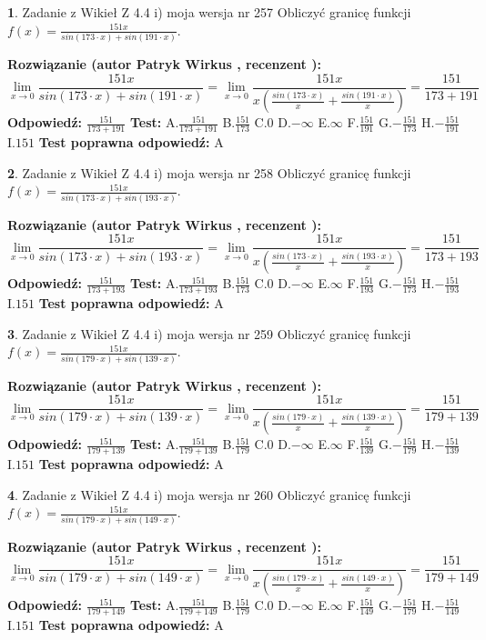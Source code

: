 \documentclass[12pt, a4paper]{article}
\theoremstyle{definition} %
\newtheorem{zad}{}
\newcommand{\zadStart}[1]{\begin{zad}#1\newline}
\newcommand{\zadStop}{\end{zad}}
\newcommand{\rozwStart}[2]{\noindent \textbf{Rozwiązanie (autor #1 , recenzent #2): }\newline}
\newcommand{\rozwStop}{\newline}
\newcommand{\odpStart}{\noindent \textbf{Odpowiedź:}\newline}
\newcommand{\odpStop}{\newline}
\newcommand{\testStart}{\noindent \textbf{Test:}\newline}
\newcommand{\testStop}{\newline}
\newcommand{\kluczStart}{\noindent \textbf{Test poprawna odpowiedź:}\newline}
\newcommand{\kluczStop}{\newline}
\begin{document}
\zadStart{Zadanie z Wikieł Z 4.4 i) moja wersja nr 257}
Obliczyć granicę funkcji $f(x)=\frac{151x}{sin(173\cdot x) +sin(191\cdot x)}$.
\zadStop
\rozwStart{Patryk Wirkus}{}
$$\lim\limits_{x\to 0}\frac{151x}{sin(173\cdot x) +sin(191\cdot x)}=\lim\limits_{x\to 0}\frac{151x}{x(\frac{sin(173\cdot x)}{x}+\frac{sin(191\cdot x)}{x})}=\frac{151}{173+191}$$
\rozwStop
\odpStart
$\frac{151}{173+191}$
\odpStop
\testStart
A.$\frac{151}{173+191}$
B.$\frac{151}{173}$
C.$0$
D.$-\infty$
E.$\infty$
F.$\frac{151}{191}$
G.$-\frac{151}{173}$
H.$-\frac{151}{191}$
I.$151$
\testStop
\kluczStart
A
\kluczStop



\zadStart{Zadanie z Wikieł Z 4.4 i) moja wersja nr 258}
Obliczyć granicę funkcji $f(x)=\frac{151x}{sin(173\cdot x) +sin(193\cdot x)}$.
\zadStop
\rozwStart{Patryk Wirkus}{}
$$\lim\limits_{x\to 0}\frac{151x}{sin(173\cdot x) +sin(193\cdot x)}=\lim\limits_{x\to 0}\frac{151x}{x(\frac{sin(173\cdot x)}{x}+\frac{sin(193\cdot x)}{x})}=\frac{151}{173+193}$$
\rozwStop
\odpStart
$\frac{151}{173+193}$
\odpStop
\testStart
A.$\frac{151}{173+193}$
B.$\frac{151}{173}$
C.$0$
D.$-\infty$
E.$\infty$
F.$\frac{151}{193}$
G.$-\frac{151}{173}$
H.$-\frac{151}{193}$
I.$151$
\testStop
\kluczStart
A
\kluczStop



\zadStart{Zadanie z Wikieł Z 4.4 i) moja wersja nr 259}
Obliczyć granicę funkcji $f(x)=\frac{151x}{sin(179\cdot x) +sin(139\cdot x)}$.
\zadStop
\rozwStart{Patryk Wirkus}{}
$$\lim\limits_{x\to 0}\frac{151x}{sin(179\cdot x) +sin(139\cdot x)}=\lim\limits_{x\to 0}\frac{151x}{x(\frac{sin(179\cdot x)}{x}+\frac{sin(139\cdot x)}{x})}=\frac{151}{179+139}$$
\rozwStop
\odpStart
$\frac{151}{179+139}$
\odpStop
\testStart
A.$\frac{151}{179+139}$
B.$\frac{151}{179}$
C.$0$
D.$-\infty$
E.$\infty$
F.$\frac{151}{139}$
G.$-\frac{151}{179}$
H.$-\frac{151}{139}$
I.$151$
\testStop
\kluczStart
A
\kluczStop



\zadStart{Zadanie z Wikieł Z 4.4 i) moja wersja nr 260}
Obliczyć granicę funkcji $f(x)=\frac{151x}{sin(179\cdot x) +sin(149\cdot x)}$.
\zadStop
\rozwStart{Patryk Wirkus}{}
$$\lim\limits_{x\to 0}\frac{151x}{sin(179\cdot x) +sin(149\cdot x)}=\lim\limits_{x\to 0}\frac{151x}{x(\frac{sin(179\cdot x)}{x}+\frac{sin(149\cdot x)}{x})}=\frac{151}{179+149}$$
\rozwStop
\odpStart
$\frac{151}{179+149}$
\odpStop
\testStart
A.$\frac{151}{179+149}$
B.$\frac{151}{179}$
C.$0$
D.$-\infty$
E.$\infty$
F.$\frac{151}{149}$
G.$-\frac{151}{179}$
H.$-\frac{151}{149}$
I.$151$
\testStop
\kluczStart
A
\kluczStop
\end{document}
